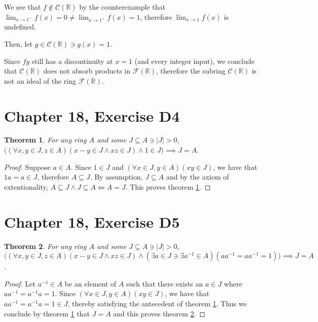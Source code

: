 \documentclass[12pt]{article}
\newcommand{\reals}{\mathbb{R}}
\newcommand{\freals}{\mathcal{F}(\reals)}
\newcommand{\creals}{\mathcal{C}(\reals)}
\newtheorem{thm}{Theorem}
\begin{document}
We see that $f \not\in \creals$ by the counterexample that
$\lim_{x \to 1^-} f(x) = 0 \neq \lim_{x \to 1^+} f(x) = 1$,
therefore
$\lim_{x \to 1} f(x)$ is undefined.

Then, let $g \in \creals \ni g(x) = 1$.

Since $fg$ still has a discontinuity at $x = 1$ (and every integer input),
we conclude that $\creals$ does not absorb products in $\freals$,
therefore the subring $\creals$ is not an ideal of the ring $\freals$.

\section{Chapter 18, Exercise D4}

\begin{thm} \label{thm7}
	For any ring $A$ and some $J \subseteq A \ni |J| > 0$,
	$\Big((\forall x,y \in J, z \in A)(x - y \in J \land xz \in J) \land 1 \in J \Big)\implies J = A$.
\end{thm}

\begin{proof}
	Suppose $a \in A$.
	Since $1 \in J$ and $(\forall x \in J, y \in A)(xy \in J)$,
	we have that $1a = a \in J$,
	therefore $A \subseteq J$.
	By assumption, $J \subseteq A$
	and by the axiom of extentionality, $A \subseteq J \land J \subseteq A \iff A = J$.
	This proves theorem \ref{thm7}.
\end{proof}

\section{Chapter 18, Exercise D5}

\begin{thm} \label{thm8}
	For any ring $A$ and some $J \subseteq A \ni |J| > 0$,
	$\Big((\forall x,y \in J, z \in A)(x - y \in J \land xz \in J)
	\land (\exists a \in J \ni \exists a^{-1} \in A)(aa^{-1} = aa^{-1} = 1) \Big)\implies J = A$.
\end{thm}

\begin{proof}
	Let $a^{-1} \in A$ be an element of $A$
	such that there exists an $a \in J$
	where $aa^{-1} = a^{-1}a = 1$.
	Since $(\forall x \in J, y \in A)(xy \in J)$,
	we have that $aa^{-1} = a^{-1}a = 1 \in J$,
	thereby satisfying the antecedent of theorem \ref{thm7}.
	Thus we conclude by theorem \ref{thm7} that $J = A$
	and this proves theorem \ref{thm8}.
\end{proof}
\end{document}
